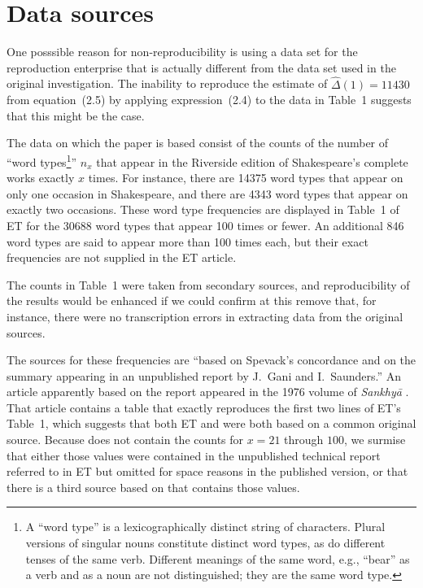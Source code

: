 
\section{Data sources} %
\label{sec:data_sources}

One posssible reason for non-reproducibility is using a data set for the reproduction enterprise that is actually different from the data set used in the original investigation.  The inability to reproduce the estimate of $\hat\Delta(1)=11430$ from equation~(2.5) by applying expression~(2.4) to the data in Table~1 suggests that this might be the case.

The data on which the paper is based consist of the counts of the number of ``word types\footnote{A ``word type'' is a lexicographically distinct string of characters.  Plural versions of singular nouns constitute distinct word types, as do different tenses of the same verb.  Different meanings of the same word, e.g., ``bear'' as a verb and as a noun are not distinguished; they are the same word type.}'' $n_x$ that appear in the Riverside edition of Shakespeare's complete works exactly $x$ times.  For instance, there are 14375 word types that appear on only one occasion in Shakespeare, and there are 4343 word types that appear on exactly two occasions.  These word type frequencies are displayed in Table~1 of ET for the 30688 word types that appear 100 times or fewer.  An additional 846 word types are said to appear more than 100 times each, but their exact frequencies are not supplied in the ET article.

The counts in Table~1 were taken from secondary sources, and reproducibility of the results would be enhanced if we could confirm at this remove that, for instance, there were no transcription errors in extracting data from the original sources.

The sources for these frequencies are ``based on Spevack's \citeyearpar{Spevack:1968qd} concordance and on the summary appearing in an unpublished report by J.~Gani and I.~Saunders.''  An article apparently based on the report appeared in the 1976 volume of \textit{Sankhy\=a} \citep{Gani:1976rg}.  That article contains a table that exactly reproduces the first two lines of ET's Table~1, which suggests that both ET and \citeauthor{Gani:1976rg} were both based on a common original source.  Because \cite{Gani:1976rg} does not contain the counts for $x=21$ through $100$, we surmise that either those values were contained in the unpublished technical report referred to in ET but omitted for space reasons in the published version, or that there is a third source based on \citeauthor{Spevack:1968qd} that contains those values.

